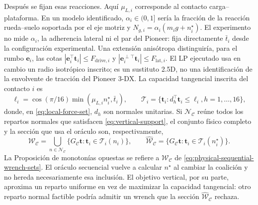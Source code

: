 \documentclass[12pt,a4paper]{article}
\begin{document}
Después se fijan esas reacciones. Aquí $\mu_{L,i}$ corresponde al contacto
carga--plataforma. En un modelo identificado, $\alpha_i\in(0,1]$ sería la
fracción de la reacción rueda--suelo soportada por el eje motriz y
$N_{g,i}=\alpha_i(m_i g+n_i^\star)$. El experimento no mide $\alpha_i$, la
adherencia lateral ni el par del Pioneer: fija directamente $\bar t_i$ desde
la configuración experimental. Una extensión
anisótropa distinguiría, para el rumbo $\mathbf e_i$, las cotas
$|\mathbf e_i^\top\mathbf t_i|\leq F_{\mathrm{drive},i}$ y
$|\mathbf e_i^{\perp\top}\mathbf t_i|\leq F_{\mathrm{lat},i}$. El LP ejecutado usa en
cambio un radio isotrópico inscrito; es un sustituto 2.5D, no una identificación
de la envolvente de tracción del Pioneer 3-DX.
La capacidad tangencial inscrita del contacto $i$ es
\begin{equation}
\ell_i=\cos(\pi/16)\min(\mu_{L,i} n_i^\star,\bar t_i),\qquad
\mathcal T_i=\{\mathbf t_i:d_h^\top\mathbf t_i\leq\ell_i, h=1,\ldots,16\},
\label{eq:local-force-set}
\end{equation}
donde, en \eqref{eq:local-force-set}, $d_h$ son normales unitarias. Si $\mathcal N_{\mathcal C}$ reúne todos
los repartos normales que satisfacen \eqref{eq:vertical-support}, el conjunto
físico completo y la sección que usa el oráculo son, respectivamente,
\begin{equation}
\mathcal W_{\mathcal C}=\bigcup_{n\in\mathcal N_{\mathcal C}}
\{G_{\mathcal C}\mathbf t:\mathbf t_i\in\mathcal T_i(n_i)\},\qquad
\widehat{\mathcal W}_{\mathcal C}=\{G_{\mathcal C}\mathbf t:
\mathbf t_i\in\mathcal T_i(n_i^\star)\}.
\label{eq:physical-sequential-wrench-sets}
\end{equation}
La Proposición de monotonías opuestas se refiere a $\mathcal W_{\mathcal C}$ de
\eqref{eq:physical-sequential-wrench-sets}.
El oráculo secuencial vuelve a calcular $n^\star$ al cambiar la coalición y no
hereda necesariamente esa inclusión. El objetivo vertical, por su parte,
aproxima un reparto uniforme en vez de maximizar la capacidad tangencial: otro reparto normal
factible podría admitir un wrench que la sección
$\widehat{\mathcal W}_{\mathcal C}$ rechaza.
\end{document}
